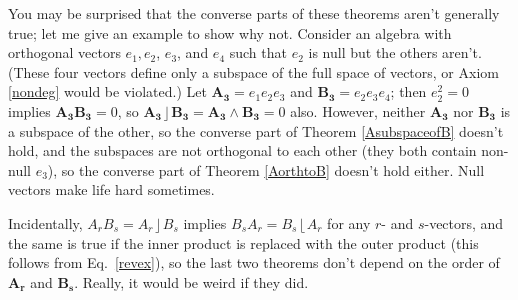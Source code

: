 \documentclass{utarticle}
\newcommand{\bl}[1]{\ensuremath{\bm{#1}}}
\DeclareMathOperator{\lin}{\rfloor}
\DeclareMathOperator{\rin}{\lfloor}
\DeclareMathOperator{\out}{\wedge}
\begin{document}
You may be surprised that the converse parts of these theorems aren't 
generally true; let me give an example to show why not.  Consider an algebra with 
orthogonal vectors $e_1, e_2$, $e_3$, and $e_4$ such that $e_2$ is null 
but the others aren't.  (These four vectors define only a subspace of the 
full space of vectors, or Axiom \ref{nondeg} would be violated.)  Let 
$\bl{A_3} = e_1 e_2 e_3$ and $\bl{B_3} = e_2 e_3 e_4$; then $e_2^2 = 0$ implies 
$\bl{A_3} \bl{B_3} = 0$, so $\bl{A_3} \lin \bl{B_3} = \bl{A_3} \out \bl{B_3} = 0$ also.  
However, neither \bl{A_3} nor \bl{B_3} is a subspace of the other, so the converse 
part of Theorem \ref{AsubspaceofB} doesn't hold, and the subspaces are not orthogonal 
to each other (they both contain non-null $e_3$), so the converse part of Theorem 
\ref{AorthtoB} doesn't hold either.  Null vectors make life hard sometimes.

Incidentally, $A_r B_s = A_r \lin B_s$ implies $B_s A_r = B_s \rin A_r$ for any 
$r$- and $s$-vectors, and the same is true if the inner product is replaced with 
the outer product (this follows from Eq.~\eqref{revex}), so the last two theorems
don't depend on the order of \bl{A_r} and \bl{B_s}.  Really, it would be weird if they did.
\end{document}
